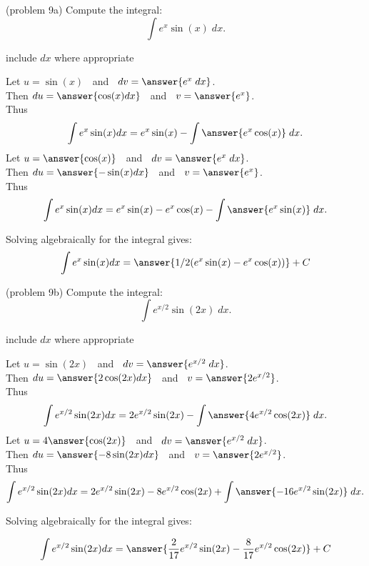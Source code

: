 \documentclass{ximera}
\begin{document}
\begin{problem}(problem 9a)
Compute the integral:
\[
\int e^x\sin(x) \; dx.
\]

\begin{hint}
      include $dx$ where appropriate
  \end{hint}
  Let $u = \sin(x)\;\;$   and   $\;\;dv = \answer{e^x \;dx}$.\\
  Then $du = \answer{\cos(x) dx}\;\;$   and   $\;\;v = \answer{e^x}$.\\
  Thus 
  \[
  \int e^x \sin(x) dx = e^x \sin(x) - \int \answer{e^x \cos(x)} \;dx. 
  \]
  Let $u = \answer{\cos(x)}\;\;$   and   $\;\;dv = \answer{e^x \;dx}$.\\
  Then $du = \answer{-\sin(x) dx}\;\;$   and   $\;\;v = \answer{e^x}$.\\
  Thus 
  \[
  \int e^x \sin(x) dx = e^x \sin(x) - e^x \cos(x) - \int \answer{e^x \sin(x)} \;dx. 
  \]
  
  Solving algebraically for the integral gives:
  \[
  \int e^x \sin(x) dx = \answer{ 1/2(e^x \sin(x) - e^x \cos(x))} + C 
  \]
  
\end{problem}


\begin{problem}(problem 9b)
Compute the integral:
\[
\int e^{x/2}\sin(2x) \; dx.
\]

  \begin{hint}
      include $dx$ where appropriate
  \end{hint}
  Let $u = \sin(2x)\;\;$   and   $\;\;dv = \answer{e^{x/2} \;dx}$.\\
  Then $du = \answer{2\cos(2x) dx}\;\;$   and   $\;\;v = \answer{2e^{x/2}}$.\\
  Thus 
  \[
  \int e^{x/2} \sin(2x) dx = 2e^{x/2} \sin(2x) - \int \answer{4e^{x/2} \cos(2x)} \;dx. 
  \]
  Let $u = 4\answer{\cos(2x)}\;\;$   and   $\;\;dv = \answer{e^{x/2} \;dx}$.\\
  Then $du = \answer{-8\sin(2x) dx}\;\;$   and   $\;\;v = \answer{2e^{x/2}}$.\\
  Thus 
  \[
  \int e^{x/2} \sin(2x) dx = 2e^{x/2} \sin(2x) -8 e^{x/2} \cos(2x) + \int \answer{-16e^{x/2} \sin(2x)} \;dx. 
  \]
  
  Solving algebraically for the integral gives:
  
  \[
  \int e^{x/2} \sin(2x) dx = \answer{ \frac{2}{17}e^{x/2} \sin(2x) - \frac{8}{17}e^{x/2} \cos(2x)} + C 
  \]
  
\end{problem}
\end{document}

